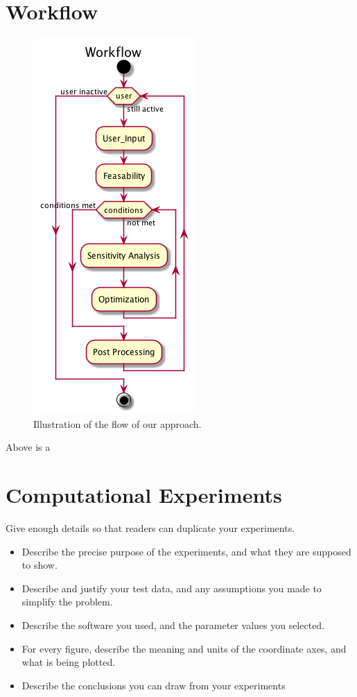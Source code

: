 \documentclass[10pt]{article}
\begin{document}
\section{Workflow}
 		\begin{figure}[h!]
		 \begin{center}\includegraphics[scale=.4]{IMSM_Workflow.png}\end{center}
		 \caption{Illustration of the flow of our approach.}
		 \label{Spring}
		 
		 \end{figure}
Above is a  

\section{Computational Experiments}
Give enough details so that readers can duplicate your experiments.

\begin{itemize}
\item Describe the precise purpose of the experiments, and what they 
are supposed to show.

\item Describe and justify your test data, and any assumptions you made to 
simplify the problem.

\item Describe the software you used, and the 
parameter values you selected.

\item 
For every figure, describe the meaning and units of the coordinate axes, 
and what is being plotted.

\item Describe the conclusions you can draw from your experiments
\end{itemize}
\end{document}
